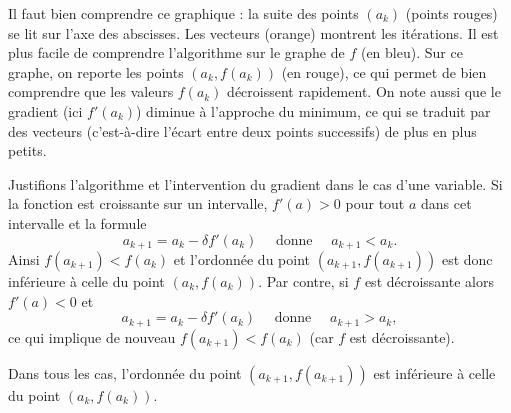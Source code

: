 \documentclass[11pt,class=report,crop=false]{standalone}
\begin{document}
\begin{exemple}
Il faut bien comprendre ce graphique : la suite des points $(a_k)$ (points rouges) se lit sur l'axe des abscisses. Les vecteurs (orange) montrent les itérations.
Il est plus facile de comprendre l'algorithme sur le graphe de $f$ (en bleu). Sur ce graphe, on reporte les points $(a_k,f(a_k))$ (en rouge), ce qui permet de bien comprendre que les valeurs $f(a_k)$ décroissent rapidement. On note aussi que le gradient (ici $f'(a_k)$) diminue à l'approche du minimum, ce qui se traduit par des vecteurs (c'est-à-dire l'écart entre deux points successifs) de plus en plus petits. 

\end{exemple}

Justifions l'algorithme et l'intervention du gradient dans le cas d'une variable.
Si la fonction est croissante sur un intervalle, $f'(a)>0$ pour tout $a$ dans cet intervalle et la formule
$$a_{k+1} = a_k - \delta f'(a_k) \quad \text{ donne } \quad a_{k+1}<a_k.$$
Ainsi $f(a_{k+1}) < f(a_k)$ et l'ordonnée du point $(a_{k+1},f(a_{k+1}))$ est donc inférieure à celle du point $(a_k,f(a_k))$.
Par contre, si $f$ est décroissante alors $f'(a)<0$ et
$$a_{k+1} = a_k - \delta f'(a_k) \quad \text{ donne } \quad a_{k+1}>a_k,$$
ce qui implique de nouveau $f(a_{k+1}) < f(a_k)$ (car $f$ est décroissante).

Dans tous les cas, l'ordonnée du point $(a_{k+1},f(a_{k+1}))$ est inférieure à celle du point $(a_k,f(a_k))$.

\end{document}
